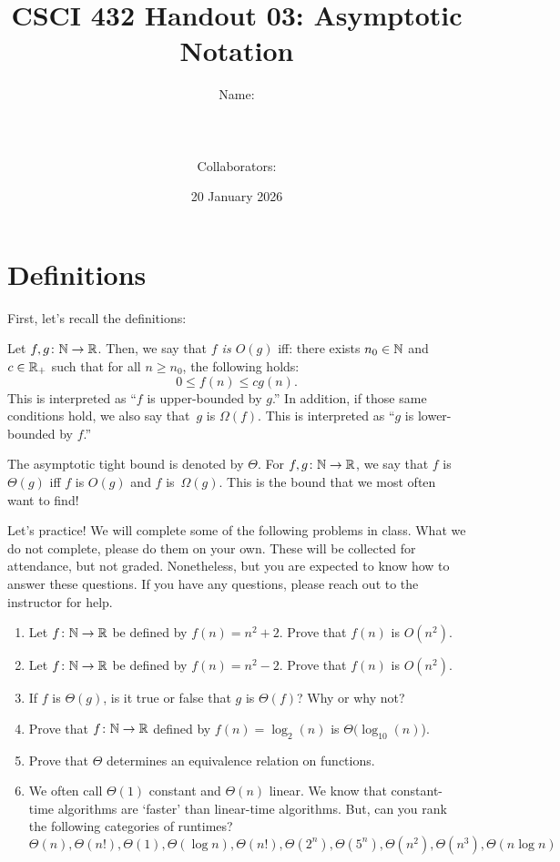 \documentclass{article}
\title{CSCI 432 Handout 03: Asymptotic Notation}
\author{Name: \rule{3in}{0.15mm} \\~\\
    Collaborators: \rule{3in}{0.15mm} }
\date{20 January 2026}
\begin{document}
\maketitle

\section*{Definitions}

First, let's recall the definitions:

\begin{definition}
    Let $f,g \colon {\mathbb N} \to {\mathbb R}$.  Then, we say that \emph{$f$ is $O(g)$} iff: there
    exists $n_0 \in {\mathbb N}$ and $c \in {\mathbb R}_{+}$ such that for all $n \geq n_0$, the
    following holds:
    $$ 0 \leq f(n) \leq cg(n). $$
    This is interpreted as ``$f$ is upper-bounded by $g$.''
    In addition, if those same conditions hold, we also say that~$g$ is $\Omega(f)$.  This is interpreted as
    ``$g$ is lower-bounded by $f$.''

    The asymptotic tight bound is denoted by $\Theta$.  For $f,g \colon {\mathbb N} \to
    {\mathbb R}$, we say that $f$ is $\Theta(g)$ iff $f$ is $O(g)$ and $f$
    is~$\Omega(g)$. This is the bound that we most often want to find!
\end{definition}

Let's practice!  We will complete some of the following problems
in class.  What we do not
complete, please do them on your own.  These will be collected for attendance,
but not graded. Nonetheless,
but you are expected to know how to answer these questions. If you have any
questions, please reach out to the instructor for help.

\begin{enumerate}
    \item Let $f \colon {\mathbb N} \to {\mathbb R}$ be defined by $f(n) = n^2+2$. Prove that
        $f(n)$ is $O(n^2)$.
        \practice
    \pagebreak
    \item Let $f \colon {\mathbb N} \to {\mathbb R}$ be defined by $f(n) = n^2-2$. Prove that
        $f(n)$ is $O(n^2)$.
        \practice
    \item If $f$ is $\Theta(g)$, is it true or false that $g$ is $\Theta(f)$?
        Why or why not?
        \practice
    \item Prove that $f \colon {\mathbb N} \to {\mathbb R}$ defined by $f(n) = \log_2(n)$ is
        $\Theta(\log_{10}(n)$).
        \practice
    \item Prove that $\Theta$ determines an equivalence relation on functions.
        \practice
    \newpage
    \item We often call $\Theta(1)$ constant and $\Theta(n)$ linear.  We know
        that constant-time algorithms are `faster' than linear-time algorithms.
        But, can you rank the following categories of runtimes?
        $$
        \Theta(n), \Theta(n!), \Theta(1), \Theta(\log n), \Theta(n!),
        \Theta(2^n), \Theta(5^n), \Theta(n^2), \Theta(n^3), \Theta(n \log n)
        $$
        \practice
\end{enumerate}
\end{document}
